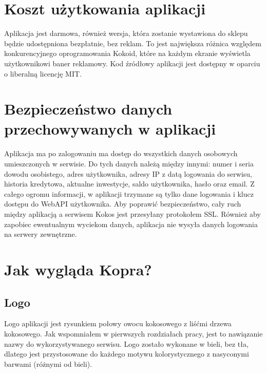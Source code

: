 \documentclass[a4paper,twoside,titlepage,openright]{book}
\begin{document}
\section{Koszt użytkowania aplikacji}

Aplikacja jest darmowa, również wersja, która zostanie wystawiona do sklepu będzie udostępniona bezpłatnie, bez reklam. To jest największa różnica względem konkurencyjnego oprogramowania Kokoid, które na każdym ekranie wyświetla użytkownikowi baner reklamowy. Kod źródłowy aplikacji jest dostępny w oparciu o liberalną licencję MIT.

\section{Bezpieczeństwo danych przechowywanych w aplikacji}

Aplikacja ma po zalogowaniu ma dostęp do wszystkich danych osobowych umieszczonych w serwisie. Do tych danych należą między innymi: numer i seria dowodu osobistego, adres użytkownika, adresy IP z datą logowania do serwisu, historia kredytowa, aktualne inwestycje, saldo użytkownika, hasło oraz email. Z całego ogromu informacji, w aplikacji trzymane są tylko dane logowania i klucz dostępu do WebAPI użytkownika. Aby poprawić bezpieczeństwo, cały ruch między aplikacją a serwisem Kokos jest przesyłany protokołem SSL. Również aby zapobiec ewentualnym wyciekom danych, aplikacja nie wysyła danych logowania na serwery zewnętrzne.

\section{Jak wygląda Kopra?}

\subsection{Logo}

Logo aplikacji jest rysunkiem połowy owocu kokosowego z liśćmi drzewa kokosowego. Jak wspomniałem w pierwszych rozdziałach pracy, jest to nawiązanie nazwy do wykorzystywanego serwisu. Logo zostało wykonane w bieli, bez tła, dlatego jest przystosowane do każdego motywu kolorystycznego z nasyconymi barwami (różnymi od bieli).
\end{document}
